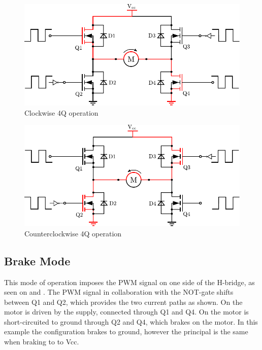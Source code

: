   \begin{minipage}{\linewidth}
  	\centering
  	\begin{minipage}{0.45\linewidth}
  		\begin{figure}[H]
  			\centering
  			\includegraphics[scale=.53]{figures/HbridgeClockwise4Q.pdf}
  			\caption{Clockwise 4Q operation}
  			\label{HbridgeClokwise4Q}
  		\end{figure}
  	\end{minipage}
  	\hspace{0.03\linewidth}
  	\begin{minipage}{0.45\linewidth}
  		\begin{figure}[H]
  			\centering
  			\includegraphics[scale=.53]{figures/HbridgeCounterClockwise4Q.pdf}
  			\caption{Counterclockwise 4Q operation}
  			\label{HbridgeCounterClokwise4Q}
  		\end{figure}
  	\end{minipage}
  \end{minipage}

\subsection{Brake Mode}
This mode of operation imposes the PWM signal on one side of the H-bridge, as seen on  and . The PWM signal in collaboration with the NOT-gate shifts between Q1 and Q2, which provides the two current paths as shown. On  the motor is driven by the supply, connected through Q1 and Q4. On  the motor is short-circuited to ground through Q2 and Q4, which brakes on the motor. In this example the configuration brakes to ground, however the principal is the same when braking to to Vcc.

